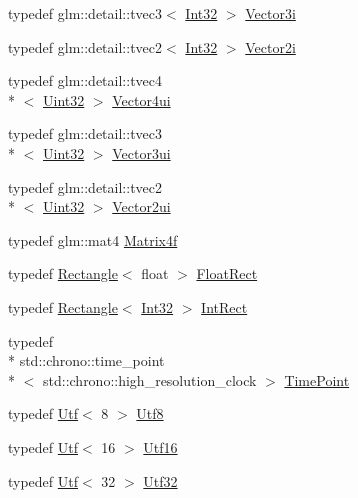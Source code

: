 \begin{DoxyCompactItemize}
\item 
typedef glm\-::detail\-::tvec3$<$ \hyperlink{namespaceburn_a96c2e82d6da686c64a6f330628466b05}{Int32} $>$ \hyperlink{namespaceburn_ae3588b23ec9999532c43728cae59bde5}{Vector3i}
\item 
typedef glm\-::detail\-::tvec2$<$ \hyperlink{namespaceburn_a96c2e82d6da686c64a6f330628466b05}{Int32} $>$ \hyperlink{namespaceburn_afb9df6e019eb84491abb84140b4da64e}{Vector2i}
\item 
typedef glm\-::detail\-::tvec4\\*
$<$ \hyperlink{namespaceburn_ab40b09022209bd449d317c1f0e95356b}{Uint32} $>$ \hyperlink{namespaceburn_a93214dd433466ae567a7bb09a8b28b79}{Vector4ui}
\item 
typedef glm\-::detail\-::tvec3\\*
$<$ \hyperlink{namespaceburn_ab40b09022209bd449d317c1f0e95356b}{Uint32} $>$ \hyperlink{namespaceburn_aa4ef7f734ba1ec7e71c01692910cc5f8}{Vector3ui}
\item 
typedef glm\-::detail\-::tvec2\\*
$<$ \hyperlink{namespaceburn_ab40b09022209bd449d317c1f0e95356b}{Uint32} $>$ \hyperlink{namespaceburn_a6805fa33c49c4c3db88a7bebba2c408f}{Vector2ui}
\item 
typedef glm\-::mat4 \hyperlink{namespaceburn_a643e9d2ffceb4304e3755a100268a7a3}{Matrix4f}
\item 
typedef \hyperlink{classburn_1_1_rectangle}{Rectangle}$<$ float $>$ \hyperlink{namespaceburn_a00aa73ce1ec2ed4393740a528395103f}{Float\-Rect}
\item 
typedef \hyperlink{classburn_1_1_rectangle}{Rectangle}$<$ \hyperlink{namespaceburn_a96c2e82d6da686c64a6f330628466b05}{Int32} $>$ \hyperlink{namespaceburn_ad4bf628019a74e35d42b2940e961a0a5}{Int\-Rect}
\item 
typedef \\*
std\-::chrono\-::time\-\_\-point\\*
$<$ std\-::chrono\-::high\-\_\-resolution\-\_\-clock $>$ \hyperlink{namespaceburn_a431c4128e194f6d8909971ef6253bca9}{Time\-Point}
\item 
typedef \hyperlink{classburn_1_1_utf}{Utf}$<$ 8 $>$ \hyperlink{namespaceburn_aeaf9e2b325886400d72e29ffa4fc0f5d}{Utf8}
\item 
typedef \hyperlink{classburn_1_1_utf}{Utf}$<$ 16 $>$ \hyperlink{namespaceburn_aa13e1efa328b40c8e3c8efcdbb5fe10c}{Utf16}
\item 
typedef \hyperlink{classburn_1_1_utf}{Utf}$<$ 32 $>$ \hyperlink{namespaceburn_ac07ce0025d1a75fd2f42073a2ce1eded}{Utf32}
\end{DoxyCompactItemize}


